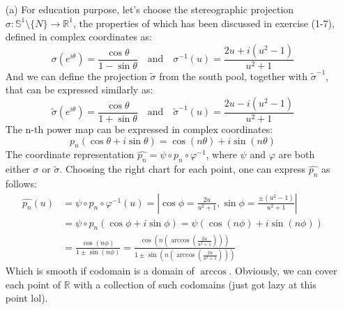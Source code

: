 \documentclass[a4paper]{article}
\begin{document}
\begin{exercise}[2-3]
  \begin{enumerate}
    \item[(a)]
      For education purpose, let's choose the stereographic projection
      $\sigma \colon \mathbb{S}^1 \setminus \{N\} \to \mathbb{R}^1$, the
      properties of which has been discussed in exercise (1-7), defined in
      complex coordinates as:
      $$
      \sigma(e^{i\theta} ) = \frac{\cos\theta}{1-\sin\theta }
      \quad \text{and} \quad
      \sigma^{-1}(u) = \frac{2u + i(u^2-1)}{u^2+1}
      $$
      And we can define the projection $\widetilde{\sigma}$ from the south pool,
      together with $\widetilde{\sigma}^{-1}$, that can be expressed similarly as:
      $$
      \widetilde{\sigma}(e^{i\theta} ) = \frac{\cos\theta}{1+\sin\theta }
      \quad \text{and} \quad
      \widetilde{\sigma}^{-1}(u) = \frac{2u - i(u^2-1)}{u^2+1}
      $$
      The n-th power map can be expressed
      in complex coordinates:
      $$
      p_n(\cos\theta + i\sin\theta) = \cos(n\theta) + i\sin(n\theta)
      $$
      The coordinate representation $\widehat{p_n} = \psi \circ p_n \circ \varphi^{-1}$,
      where $\psi$ and $\varphi$ are both either $\sigma$ or $\widetilde{\sigma}$.
      Choosing the right chart for each point, one can express $\widehat{p_n}$ as follows:
      \begin{align*}
        \widehat{p_n}(u) &= \psi \circ p_n \circ \varphi^{-1}(u) =
        \left| \cos\phi = \frac{2u}{u^2+1}, \sin\phi = \frac{\pm (u^2-1)}{u^2+1}\right|
        \\&=
        \psi \circ p_n (\cos\phi + i\sin\phi) = \psi(\cos(n\phi) + i\sin(n\phi))
        \\&=
        \frac{\cos(n\phi)}{1 \pm \sin(n\phi)} = 
        \frac{\cos\left(n\left( \arccos\left( \frac{2u}{u^2+1} \right)  \right)\right) }
        {1 \pm \sin\left(n\left( \arccos\left( \frac{2u}{u^2+1} \right) \right) \right)}
      \end{align*}
      Which is smooth if codomain is a domain of $\arccos$. Obviously, we can cover
      each point of $\mathbb{R}$ with a collection of such codomains (just got lazy at this point lol).


\end{enumerate}
\end{exercise}
\end{document}
